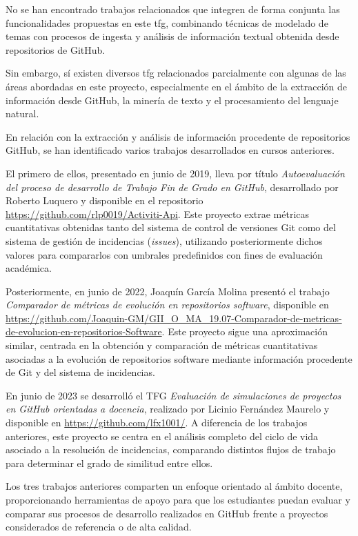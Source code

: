
No se han encontrado trabajos relacionados que integren de forma conjunta las
funcionalidades propuestas en este \acrshort{tfg}, combinando técnicas de
modelado de temas con procesos de ingesta y análisis de información textual
obtenida desde repositorios de GitHub.

Sin embargo, sí existen diversos \acrlong{tfg} relacionados parcialmente con
algunas de las áreas abordadas en este proyecto, especialmente en el ámbito de
la extracción de información desde GitHub, la minería de texto y el
procesamiento del lenguaje natural.

En relación con la extracción y análisis de información procedente de
repositorios GitHub, se han identificado varios trabajos desarrollados en
cursos anteriores.

El primero de ellos, presentado en junio de 2019, lleva por título
\textit{Autoevaluación del proceso de desarrollo de Trabajo Fin de Grado en
      GitHub}, desarrollado por Roberto Luquero y disponible en el repositorio
\url{https://github.com/rlp0019/Activiti-Api}. Este proyecto extrae métricas
cuantitativas obtenidas tanto del sistema de control de versiones Git como del
sistema de gestión de incidencias (\textit{issues}), utilizando posteriormente
dichos valores para compararlos con umbrales predefinidos con fines de
evaluación académica.

Posteriormente, en junio de 2022, Joaquín García Molina presentó el trabajo
\textit{Comparador de métricas de evolución en repositorios software},
disponible en
\url{https://github.com/Joaquin-GM/GII_O_MA_19.07-Comparador-de-metricas-de-evolucion-en-repositorios-Software}.
Este proyecto sigue una aproximación similar, centrada en la obtención y
comparación de métricas cuantitativas asociadas a la evolución de repositorios
software mediante información procedente de Git y del sistema de incidencias.

En junio de 2023 se desarrolló el TFG \textit{Evaluación de simulaciones de
      proyectos en GitHub orientadas a docencia}, realizado por Licinio Fernández
Maurelo y disponible en \url{https://github.com/lfx1001/}. A diferencia de los
trabajos anteriores, este proyecto se centra en el análisis completo del ciclo
de vida asociado a la resolución de incidencias, comparando distintos flujos de
trabajo para determinar el grado de similitud entre ellos.

Los tres trabajos anteriores comparten un enfoque orientado al ámbito docente,
proporcionando herramientas de apoyo para que los estudiantes puedan evaluar y
comparar sus procesos de desarrollo realizados en GitHub frente a proyectos
considerados de referencia o de alta calidad.

